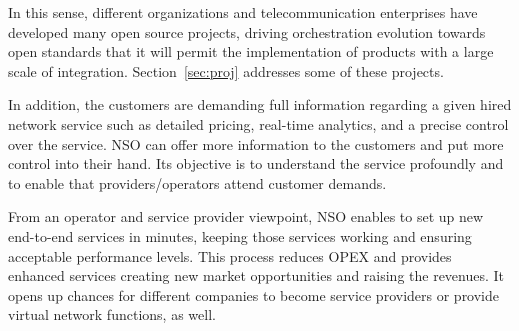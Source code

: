 


In this sense, different organizations and telecommunication enterprises have developed many open source projects, driving orchestration evolution towards open standards that it will permit the implementation of products with a large scale of integration. Section~\ref{sec:proj} addresses some of these projects.

In addition, the customers are demanding full information regarding a given hired network service such as detailed pricing, real-time analytics, and a precise control over the service. NSO can offer more information to the customers and put more control into their hand. Its objective is to understand the service profoundly and to enable that providers/operators attend customer demands. 

From an operator and service provider viewpoint, NSO enables to set up new end-to-end services in minutes, keeping those services working and ensuring acceptable performance levels. This process reduces OPEX and provides enhanced services creating new market opportunities and raising the revenues.  It opens up chances for different companies to become service providers or provide virtual network functions, as well.


